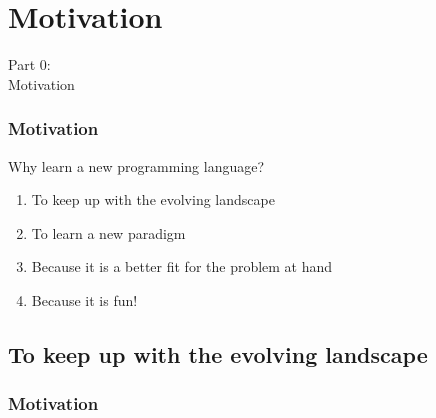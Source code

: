 {
\renewcommand{\bgcolor}{motic}

\section{Motivation}
\begin{frame}
    \vspace{25mm}
    \begin{center}
        \Huge{Part 0:\\Motivation}
    \end{center}
\end{frame}

\begin{frame}
    \frametitle{Motivation}
    \vspace{3mm}
    Why learn a new programming language?
    
    \pause
    \vspace{3mm}
    \begin{enumerate}
      \item To keep up with the evolving landscape
      \item To learn a new paradigm
      \item Because it is a better fit for the problem at hand
      \item Because it is fun!
    \end{enumerate}
\end{frame}

\subsection{To keep up with the evolving landscape}
\begin{frame}
  \frametitle{Motivation }
  \vspace{3mm}
  \begin{center}
\end{center}
\end{frame}}
